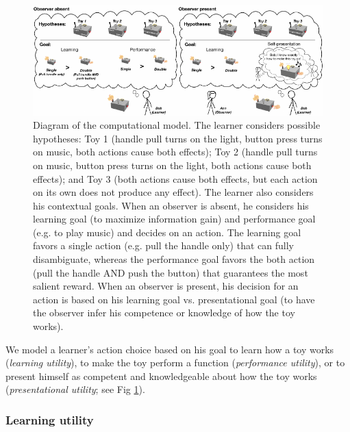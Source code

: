\documentclass[10pt, letterpaper]{article}
\newenvironment{CodeChunk}{}{}
\begin{document}
\begin{CodeChunk}
\begin{figure}[tb]

{\centering \includegraphics[width=0.95\linewidth]{figs/model_diagram-1} 

}

\caption[Diagram of the computational model]{Diagram of the computational model. The learner considers possible hypotheses: Toy 1 (handle pull turns on the light, button press turns on music, both actions cause both effects); Toy 2 (handle pull turns on music, button press turns on the light, both actions cause both effects); and Toy 3 (both actions cause both effects, but each action on its own does not produce any effect). The learner also considers his contextual goals. When an observer is absent, he considers his learning goal (to maximize information gain) and performance goal (e.g. to play music) and decides on an action. The learning goal favors a single action (e.g. pull the handle only) that can fully disambiguate, whereas the performance goal favors the both action (pull the handle AND push the button) that guarantees the most salient reward. When an observer is present, his decision for an action is based on his learning goal vs. presentational goal (to have the observer infer his competence or knowledge of how the toy works).}\label{fig:model_diagram}
\end{figure}
\end{CodeChunk}

We model a learner's action choice based on his goal to learn how a toy
works (\emph{learning utility}), to make the toy perform a function
(\emph{performance utility}), or to present himself as competent and
knowledgeable about how the toy works (\emph{presentational utility};
see Fig \ref{fig:model_diagram}).

\subsubsection{Learning utility}\label{learning-utility}
\end{document}
